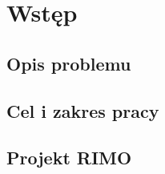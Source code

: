 %
\chapter{Wstęp}
\label{sec:wstep}

\section{Opis problemu}
\label{sec:wstep:opis_problemu}

\section{Cel i zakres pracy}
\label{sec:wstep:cel_i_zakres}

\section{Projekt RIMO}
\label{sec:wstep:rimo}